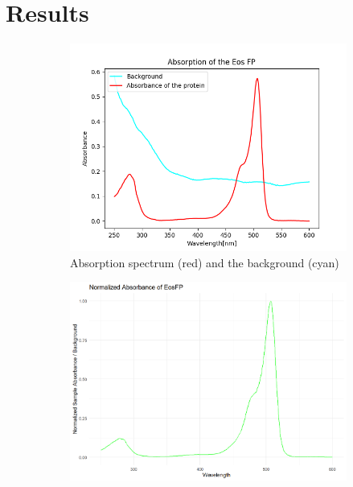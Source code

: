 \documentclass[a4paper,english,12pt,bibliography=totoc]{scrreprt}
\begin{document}
\chapter{Results}
\label{cha:Results}



\begin{figure}[htbp]
    \centering
    \begin{subfigure}[b]{0.45\textwidth}
        \includegraphics[width=\textwidth]{Figures/Absorption.png}
        \caption{Absorption spectrum (red) and the background (cyan)}
        \label{fig:sub1}
    \end{subfigure}
    \quad %
    \begin{subfigure}[b]{0.45\textwidth}
        \includegraphics[width=\textwidth]{Figures/absorbance.png}

\end{subfigure}
\end{figure}
\end{document}
